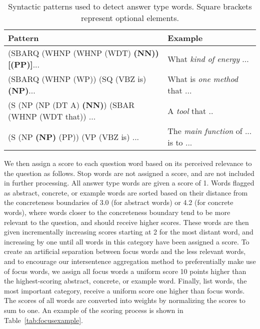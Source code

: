 \begin{table*}[t]
\caption{{Syntactic patterns used to detect answer type words.  Square brackets represent optional elements. }}
\begin{center}
\begin{footnotesize}
\begin{tabular}{ll}
\hline
\multicolumn{1}{l}{Pattern} & \multicolumn{1}{l}{Example} 	\\
\hline
(SBARQ (WHNP (WHNP (WDT) {\bf (NN)) [(PP)]}...						& What {\em kind of energy} ...    	\\
(SBARQ (WHNP (WP)) (SQ (VBZ is) {\bf (NP)}...	 					& What is {\em one method} that ... 	\\
(S (NP (NP (DT A) {\bf (NN)}) (SBAR (WHNP (WDT that)) ...			& A {\em tool} that ..					\\
(S (NP {\bf (NP)} (PP)) (VP (VBZ is) ...    						& The {\em main function} of ... is to ...	\\

\end{tabular}
\end{footnotesize}

\label{tab:answertypewords}
\end{center}
\end{table*}





{} We then assign a score to each question word based on its perceived relevance to the question as follows. 
Stop words are not assigned a score, and are not included in further processing.
All answer type words are given a score of 1.  Words flagged as abstract, concrete, or example words are sorted based on their distance from the concreteness boundaries of 3.0 (for abstract words) or 4.2 (for concrete words), where words closer to the concreteness boundary tend to be more relevant to the question, and should receive higher scores.
These words are then given incrementally increasing scores starting at 2 for the most distant word, and increasing by one until all words in this category have been assigned a score.
To create an artificial separation between focus words and the less relevant words, and to encourage our intersentence aggregation method to preferentially make use of focus words, we assign all focus words a uniform score 10 points higher than the highest-scoring abstract, concrete, or example word.  
Finally, list words, the most important category, receive a uniform score one higher than focus words.  The scores of all words are converted into weights by normalizing the scores to sum to one. 
An example of the scoring process is shown in Table~\ref{tab:focusexample}. 

